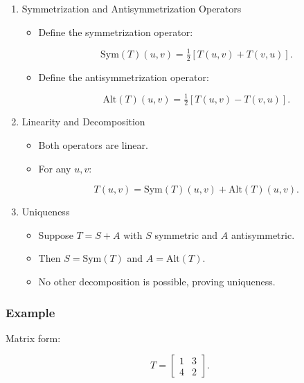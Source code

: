 \documentclass[
  letterpaper,
  DIV=11,
  numbers=noendperiod]{scrreprt}
\providecommand{\tightlist}{%
  \setlength{\itemsep}{0pt}\setlength{\parskip}{0pt}}
\begin{document}
\begin{enumerate}
\def\labelenumi{\arabic{enumi}.}
\item
  Symmetrization and Antisymmetrization Operators

  \begin{itemize}
  \item
    Define the symmetrization operator:

    \[
    \text{Sym}(T)(u,v) = \tfrac{1}{2}[T(u,v) + T(v,u)].
    \]
  \item
    Define the antisymmetrization operator:

    \[
    \text{Alt}(T)(u,v) = \tfrac{1}{2}[T(u,v) - T(v,u)].
    \]
  \end{itemize}
\item
  Linearity and Decomposition

  \begin{itemize}
  \item
    Both operators are linear.
  \item
    For any \(u,v\):

    \[
    T(u,v) = \text{Sym}(T)(u,v) + \text{Alt}(T)(u,v).
    \]
  \end{itemize}
\item
  Uniqueness

  \begin{itemize}
  \tightlist
  \item
    Suppose \(T = S + A\) with \(S\) symmetric and \(A\) antisymmetric.
  \item
    Then \(S = \text{Sym}(T)\) and \(A = \text{Alt}(T)\).
  \item
    No other decomposition is possible, proving uniqueness.
  \end{itemize}
\end{enumerate}

\subsubsection{Example}\label{example-2}

Matrix form:

\[
T = \begin{bmatrix} 1 & 3 \\ 4 & 2 \end{bmatrix}.
\]
\end{document}
